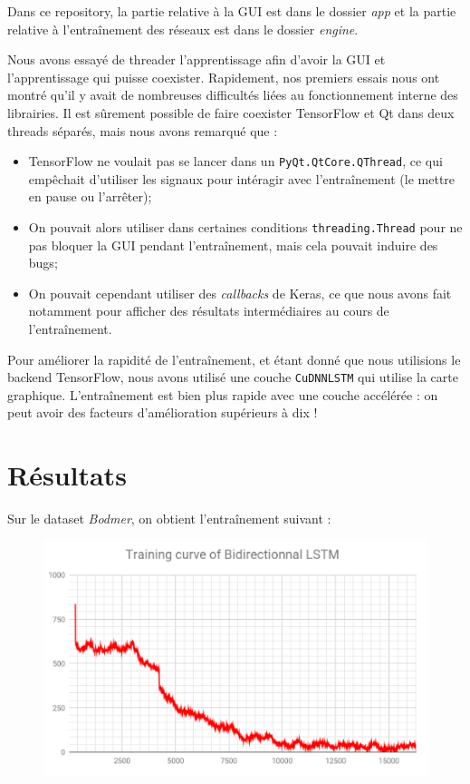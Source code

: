 \documentclass{report}
\begin{document}
Dans ce repository, la partie relative à la GUI est dans le dossier \textit{app} et la partie relative à l'entraînement des réseaux est dans le dossier \textit{engine}.

Nous avons essayé de threader l'apprentissage afin d'avoir la GUI et l'apprentissage qui puisse coexister.
Rapidement, nos premiers essais nous ont montré qu'il y avait de nombreuses difficultés liées au fonctionnement interne des librairies.
Il est sûrement possible de faire coexister TensorFlow et Qt dans deux threads séparés, mais nous avons remarqué que :
\begin{itemize}
	\item TensorFlow ne voulait pas se lancer dans un \texttt{PyQt.QtCore.QThread}, ce qui empêchait d'utiliser les signaux pour intéragir avec l'entraînement (le mettre en pause ou l'arrêter);
	\item On pouvait alors utiliser dans certaines conditions \texttt{threading.Thread} pour ne pas bloquer la GUI pendant l'entraînement, mais cela pouvait induire des bugs;
	\item On pouvait cependant utiliser des \textit{callbacks} de Keras, ce que nous avons fait notamment pour afficher des résultats intermédiaires au cours de l'entraînement.
\end{itemize}

Pour améliorer la rapidité de l'entraînement, et étant donné que nous utilisions le backend TensorFlow, nous avons utilisé une couche \texttt{CuDNNLSTM} qui utilise la carte graphique.
L'entraînement est bien plus rapide avec une couche accélérée : on peut avoir des facteurs d'amélioration supérieurs à dix !

\section{Résultats}

Sur le dataset \textit{Bodmer}, on obtient l'entraînement suivant :

\begin{figure}[!htb]
	\begin{center}
		\includegraphics[width=0.7\linewidth]{img/keras-traincurve.png}
	\end{center}
\end{figure}
\end{document}
